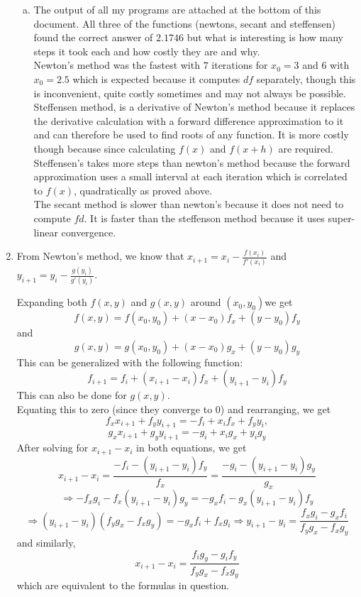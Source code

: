 \begin{enumerate}[1.]
\begin{enumerate}[(a)]
	
	\item The output of all my programs are attached at the bottom of this document. All three of the functions (newtons, secant and steffensen) found the correct answer of $2.1746$ but what is interesting is how many steps it took each and how costly they are and why. \\
	Newton's method was the fastest with $7$ iterations for $x_0=3$ and $6$ with $x_0=2.5$ which is expected because it computes $df$ separately, though this is inconvenient, quite costly sometimes and may not always be possible. Steffensen method, is a derivative of Newton's method because it replaces the derivative calculation with a forward difference approximation to it and can therefore be used to find roots of any function. It is more costly though because since calculating $f(x)$ and $f(x+h)$ are required. Steffensen's takes more steps than newton's method because the forward approximation uses a small interval  at each iteration which is correlated to $f(x)$, quadratically as proved above.\\
	The secant method is slower than newton's because it does not need to compute $fd$. It is faster than the steffenson method because it uses super-linear convergence.
	
	
	\end{enumerate}

\item 

From Newton's method, we know that $x_{i+1}=x_i-\frac{f(x_i)}{f'(x_i)}$ and $y_{i+1}=y_i-\frac{g(y_i)}{g'(y_i)}$. 

Expanding both $f(x,y)$ and $g(x,y)$ around $(x_0,y_0)$we  get $$f(x,y)=f(x_0,y_0)+(x-x_0)f_x+(y-y_0)f_y$$ and $$g(x,y)=g(x_0,y_0)+(x-x_0)g_x+(y-y_0)g_y$$
This can be generalized with the following function:$$f_{i+1}=f_i+(x_{i+1}-x_i)f_x+(y_{i+1}-y_i)f_y$$
This can also be done for $g(x,y)$.\\
Equating this to zero (since they converge to $0$) and rearranging, we get $$f_xx_{i+1}+f_yy_{i+1}=-f_i+x_if_x+f_yy_i,$$ 
$$g_xx_{i+1}+g_yy_{i+1}=-g_i+x_ig_x+y_ig_y$$
After solving for $x_{i+1}-x_i$ in both equations, we get $$x_{i+1}-x_i=\frac{-f_i-(y_{i+1}-y_i)f_y}{f_x}=\frac{-g_i-(y_{i+1}-y_i)g_y}{g_x}$$
$$\Rightarrow -f_xg_i-f_x(y_{i+1}-y_i)g_y=-g_xf_i-g_x(y_{i+1}-y_i)f_y$$
$$\Rightarrow (y_{i+1}-y_i)(f_yg_x-f_xg_y)=-g_xf_i+f_xg_i\Rightarrow y_{i+1}-y_i=\frac{f_xg_i-g_xf_i}{f_yg_x-f_xg_y}$$
and similarly, $$x_{i+1}-x_i=\frac{f_ig_y-g_if_y}{f_yg_x-f_xg_y}$$
which are equivalent to the formulas in question. 

\end{enumerate}





